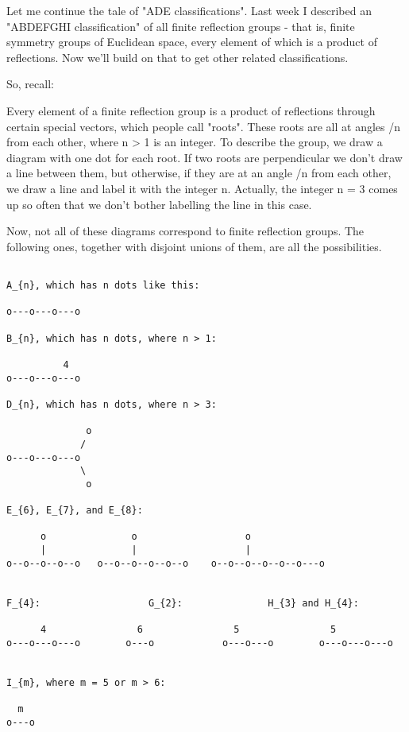 

Let me continue the tale of "ADE classifications".  Last week
I described an "ABDEFGHI classification" of all finite reflection
groups - that is, finite symmetry groups of Euclidean space,
every element of which is a product of reflections.  Now we'll build
on that to get other related classifications.

So, recall:

Every element of a finite reflection group is a product of reflections
through certain special vectors, which people call "roots".  These
roots are all at angles \pi /n from each other, where n > 1 is an
integer.  To describe the group, we draw a diagram with one dot for
each root.  If two roots are perpendicular we don't draw a line
between them, but otherwise, if they are at an angle \pi /n from each
other, we draw a line and label it with the integer n.  Actually, the
integer n = 3 comes up so often that we don't bother labelling the
line in this case.

Now, not all of these diagrams correspond to finite reflection 
groups.  The following ones, together with disjoint unions of them, 
are all the possibilities.


\begin{verbatim}

A_{n}, which has n dots like this:

o---o---o---o

B_{n}, which has n dots, where n > 1:

          4
o---o---o---o

D_{n}, which has n dots, where n > 3:

              o
             /
o---o---o---o
             \
              o

E_{6}, E_{7}, and E_{8}:

      o               o                   o
      |               |                   |
o--o--o--o--o   o--o--o--o--o--o    o--o--o--o--o--o---o


F_{4}:                   G_{2}:               H_{3} and H_{4}:

      4                6                5                5
o---o---o---o        o---o            o---o---o        o---o---o---o


I_{m}, where m = 5 or m > 6:

  m
o---o

\end{verbatim}
    

